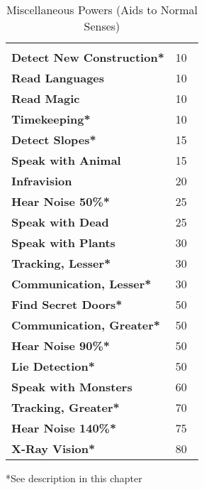 \begin{multicols*}{2}
\begin {table}[H]
  \caption{Miscellaneous Powers (Aids to Normal Senses)}
  \begin{tabularx}{\columnwidth}{>{\bfseries}YY}
   & \\
	Detect New Construction* & 10\\
	Read Languages & 10\\
	Read Magic & 10\\
	Timekeeping* & 10\\
	Detect Slopes* & 15\\
	Speak with Animal & 15\\
	Infravision & 20\\
	Hear Noise 50\%* & 25\\
	Speak with Dead & 25\\
	Speak with Plants & 30\\
	Tracking, Lesser* & 30\\
	Communication, Lesser* & 30\\
	Find Secret Doors* & 50\\
	Communication, Greater* & 50\\
	Hear Noise 90\%* & 50\\
	Lie Detection* & 50\\
	Speak with Monsters & 60\\
	Tracking, Greater* & 70\\
	Hear Noise 140\%* & 75\\
	X-Ray Vision* & 80\
  \end {tabularx}
	*See description in this chapter
\end {table}


\end{multicols*}
